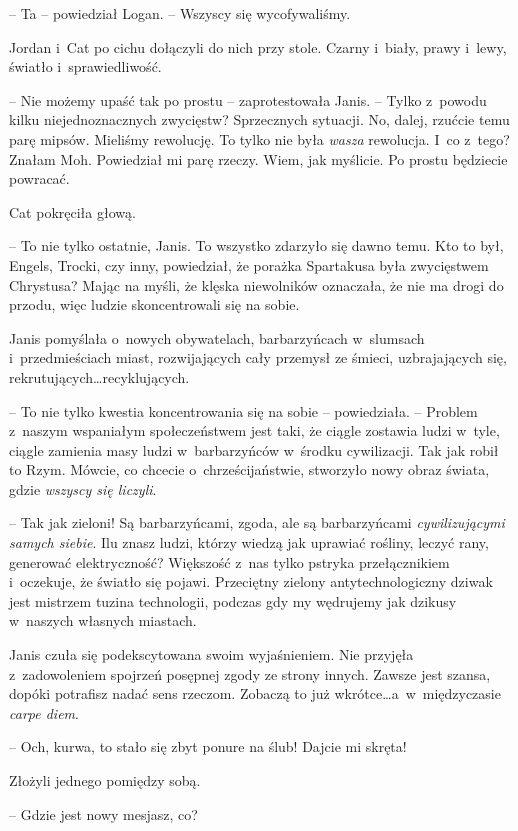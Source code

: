 \documentclass[oneside,polish,11pt,sfheadings]{mwbk}
\begin{document}
-- Ta -- powiedział Logan. -- Wszyscy się wycofywaliśmy.

Jordan i~Cat po cichu dołączyli do nich przy stole. Czarny i~biały,
prawy i~lewy, światło i~sprawiedliwość.

-- Nie możemy upaść tak po prostu -- zaprotestowała Janis. -- Tylko z~powodu kilku niejednoznacznych zwycięstw? Sprzecznych sytuacji. No,
dalej, rzućcie temu parę mipsów. Mieliśmy rewolucję. To tylko nie była
\emph{wasza} rewolucja. I~co z~tego? Znałam Moh. Powiedział mi parę
rzeczy. Wiem, jak myślicie. Po prostu będziecie powracać.

Cat pokręciła głową. 

-- To nie tylko ostatnie, Janis. To wszystko
zdarzyło się dawno temu. Kto to był, Engels, Trocki, czy inny,
powiedział, że porażka Spartakusa była zwycięstwem Chrystusa? Mając na
myśli, że klęska niewolników oznaczała, że nie ma drogi do przodu, więc
ludzie skoncentrowali się na sobie.

Janis pomyślała o~nowych obywatelach, barbarzyńcach w~slumsach i~przedmieściach miast, rozwijających cały przemysł ze śmieci,
uzbrajających się, rekrutujących\ldots recyklujących.

-- To nie tylko kwestia koncentrowania się na sobie -- powiedziała. -- Problem z~naszym wspaniałym społeczeństwem jest taki, że ciągle zostawia
ludzi w~tyle, ciągle zamienia masy ludzi w~barbarzyńców w~środku
cywilizacji. Tak jak robił to Rzym. Mówcie, co chcecie o~chrześcijaństwie, stworzyło nowy obraz świata, gdzie \emph{wszyscy się
liczyli}.

-- Tak jak zieloni! Są barbarzyńcami, zgoda, ale są barbarzyńcami
\emph{cywilizującymi samych siebie}. Ilu znasz ludzi, którzy wiedzą jak
uprawiać rośliny, leczyć rany, generować elektryczność? Większość z~nas
tylko pstryka przełącznikiem i~oczekuje, że światło się pojawi.
Przeciętny zielony antytechnologiczny dziwak jest mistrzem tuzina
technologii, podczas gdy my wędrujemy jak dzikusy w~naszych własnych
miastach.

Janis czuła się podekscytowana swoim wyjaśnieniem. Nie przyjęła z~zadowoleniem spojrzeń posępnej zgody ze strony innych. Zawsze jest
szansa, dopóki potrafisz nadać sens rzeczom. Zobaczą to już wkrótce\ldots a~w~międzyczasie \emph{carpe diem}.

-- Och, kurwa, to stało się zbyt ponure na ślub! Dajcie mi skręta!

Złożyli jednego pomiędzy sobą. 

-- Gdzie jest nowy mesjasz, co?
\end{document}
